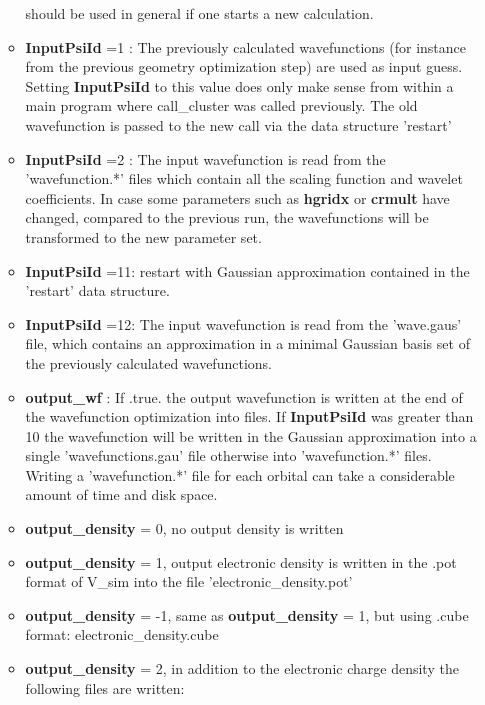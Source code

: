 \documentclass[a4paper,11pt]{report}
\begin{document}
\begin{itemize}
\begin{itemize}
                                    should be used in general if one starts a new calculation. 
       \item {\bf InputPsiId } =1 : The previously calculated wavefunctions (for instance from the previous 
                                    geometry optimization step) are used as input guess. Setting {\bf InputPsiId } to 
                                    this value does only make sense from within a main program where call\_cluster was 
                                    called previously. The old wavefunction is passed to the new call via the data structure 'restart'
       \item {\bf InputPsiId } =2 : The input wavefunction is read from the 'wavefunction.*' files which contain all the 
                                    scaling function and wavelet coefficients. In case some parameters such as {\bf hgridx} 
                                    or {\bf crmult} have changed, compared to the previous run, the wavefunctions will be 
                                    transformed to the new parameter set.
       \item {\bf InputPsiId } =11: restart with Gaussian approximation contained in the 'restart' data structure.
       \item {\bf InputPsiId } =12: The input wavefunction is read from the 'wave.gaus'  file, which contains an 
                                    approximation in a minimal Gaussian basis set of the previously calculated wavefunctions.
       \item {\bf output\_wf} : If .true. the output wavefunction is written at the end of the wavefunction optimization 
                               into files. If {\bf InputPsiId } was greater than 10 the wavefunction will be written 
                               in the Gaussian approximation into  a single 'wavefunctions.gau' file otherwise into 
                               'wavefunction.*' files. Writing a  'wavefunction.*' file for each orbital can take a considerable 
                               amount of time and disk space. 
       \item {\bf output\_density} = 0, no output density is written
       \item {\bf output\_density} = 1, output electronic density is written in the .pot format of V\_sim into the file 'electronic_density.pot'
       \item {\bf output\_density} = -1, same as  {\bf output\_density} = 1, but using .cube format: electronic_density.cube
       \item {\bf output\_density} = 2, in addition to the electronic charge density the following files are written:

\end{itemize}
\end{itemize}
\end{document}
